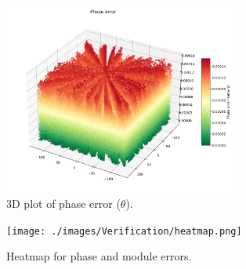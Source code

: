 \begin{figure}[H]
    \centering
    \includegraphics[width=0.7\textwidth]{./images/Verification/phase_error.png}
    \caption{3D plot of phase error (\( \theta \)).}
    \label{fig:phase_error}
\end{figure}

\begin{figure}[H]
    \centering
    \texttt{[image: ./images/Verification/heatmap.png]}
    \caption{Heatmap for phase and module errors.}
    \label{fig:heatmap_error}
\end{figure}









